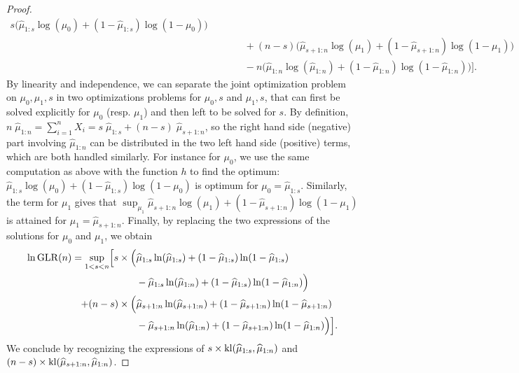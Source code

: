 \begin{proof}
\begin{align*}
            s \bigl( \widehat{\mu}_{1:s} \log(\mu_0) + (1 - \widehat{\mu}_{1:s}) \log(1-\mu_0) \bigr) \\
            & \hspace{35pt} + (n-s) \bigl( \widehat{\mu}_{s+1:n} \log(\mu_1) + (1 - \widehat{\mu}_{s+1:n}) \log(1-\mu_1) \bigr) \\
            & \hspace{35pt} - n \bigl( \widehat{\mu}_{1:n} \log(\widehat{\mu}_{1:n}) + (1 - \widehat{\mu}_{1:n}) \log(1-\widehat{\mu}_{1:n}) \bigr)
        \Bigr].
    \end{align*}
    By linearity and independence, we can separate the joint optimization problem on $\mu_0,\mu_1,s$ in two optimizations problems for $\mu_0,s$ and $\mu_1,s$, that can first be solved explicitly for $\mu_0$ (resp. $\mu_1$) and then left to be solved for $s$.
    By definition, $n \; \widehat{\mu}_{1:n} = \sum_{i=1}^n X_i = s \;\widehat{\mu}_{1:s} + (n-s) \;\widehat{\mu}_{s+1:n}$, so the right hand side (negative) part involving $\widehat{\mu}_{1:n}$ can be distributed in the two left hand side (positive) terms,
    which are both handled similarly.
    For instance for $\mu_0$, we use the same computation as above with the function $h$ to find the optimum:
    $\widehat{\mu}_{1:s} \log(\mu_0) + (1 - \widehat{\mu}_{1:s}) \log(1-\mu_0)$
    is optimum for $\mu_0 = \widehat{\mu}_{1:s}$.
    Similarly, the term for $\mu_1$ gives that $\sup_{\mu_1} \widehat{\mu}_{s+1:n} \log(\mu_1) + (1 - \widehat{\mu}_{s+1:n}) \log(1-\mu_1)$
    is attained for $\mu_1 = \widehat{\mu}_{s+1:n}$.
    Finally, by replacing the two expressions of the solutions for $\mu_0$ and $\mu_1$,
    we obtain
    \begin{align*}
        \ln \mathrm{GLR}(n)
        = \sup\limits_{1 < s < n} \Bigl[
            s \times \Bigl(
                    & \widehat{\mu}_{1:s} \ln(\widehat{\mu}_{1:s}) + (1 - \widehat{\mu}_{1:s}) \ln(1-\widehat{\mu}_{1:s}) \\
                    & - \widehat{\mu}_{1:s} \ln(\widehat{\mu}_{1:n}) + (1 - \widehat{\mu}_{1:s}) \ln(1-\widehat{\mu}_{1:n})
            \Bigr) \\
            + (n-s) \times \Bigl(
                & \widehat{\mu}_{s+1:n} \ln(\widehat{\mu}_{s+1:n}) + (1 - \widehat{\mu}_{s+1:n}) \ln(1-\widehat{\mu}_{s+1:n}) \\
                & - \widehat{\mu}_{s+1:n} \ln(\widehat{\mu}_{1:n}) + (1 - \widehat{\mu}_{s+1:n}) \ln(1-\widehat{\mu}_{1:n})
            \Bigr)
        \Bigr].
    \end{align*}
    We conclude by recognizing the expressions of $s \times \mathrm{kl}(\widehat{\mu}_{1:s}, \widehat{\mu}_{1:n})$
    and $(n-s) \times \mathrm{kl}(\widehat{\mu}_{s+1:n}, \widehat{\mu}_{1:n})$.
\end{proof}


